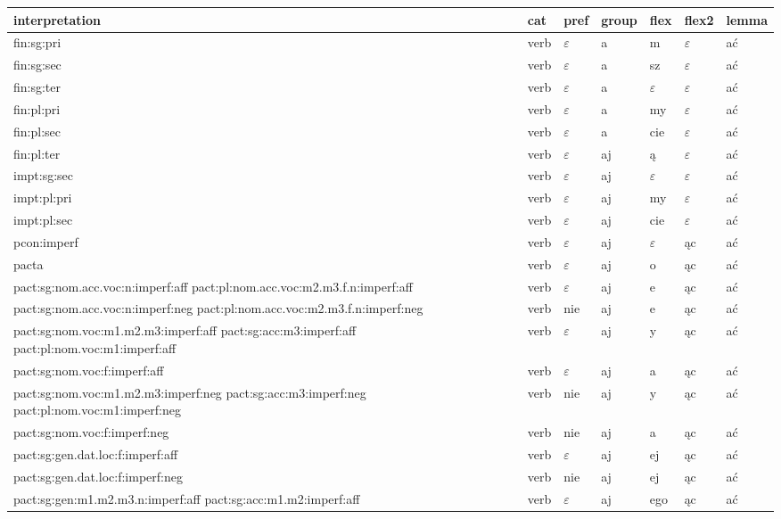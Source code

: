 \documentclass{article}
\begin{document}
\begin{longtable}{p{7cm}|l|l|l|l|l|l}
interpretation & cat & pref & group & flex & flex2 & lemma\\
\hline
fin:sg:pri & verb & $\varepsilon$ & a & m & $\varepsilon$ & ać\\
fin:sg:sec & verb & $\varepsilon$ & a & sz & $\varepsilon$ & ać\\
fin:sg:ter & verb & $\varepsilon$ & a & $\varepsilon$ & $\varepsilon$ & ać\\
fin:pl:pri & verb & $\varepsilon$ & a & my & $\varepsilon$ & ać\\
fin:pl:sec & verb & $\varepsilon$ & a & cie & $\varepsilon$ & ać\\
fin:pl:ter & verb & $\varepsilon$ & aj & ą & $\varepsilon$ & ać\\
impt:sg:sec & verb & $\varepsilon$ & aj & $\varepsilon$ & $\varepsilon$ & ać\\
impt:pl:pri & verb & $\varepsilon$ & aj & my & $\varepsilon$ & ać\\
impt:pl:sec & verb & $\varepsilon$ & aj & cie & $\varepsilon$ & ać\\
pcon:imperf & verb & $\varepsilon$ & aj & $\varepsilon$ & ąc & ać\\
pacta & verb & $\varepsilon$ & aj & o & ąc & ać\\
pact:sg:nom.acc.voc:n:imperf:aff pact:pl:nom.acc.voc:m2.m3.f.n:imperf:aff & verb & $\varepsilon$ & aj & e & ąc & ać\\
pact:sg:nom.acc.voc:n:imperf:neg pact:pl:nom.acc.voc:m2.m3.f.n:imperf:neg & verb & nie & aj & e & ąc & ać\\
pact:sg:nom.voc:m1.m2.m3:imperf:aff pact:sg:acc:m3:imperf:aff pact:pl:nom.voc:m1:imperf:aff & verb & $\varepsilon$ & aj & y & ąc & ać\\
pact:sg:nom.voc:f:imperf:aff & verb & $\varepsilon$ & aj & a & ąc & ać\\
pact:sg:nom.voc:m1.m2.m3:imperf:neg pact:sg:acc:m3:imperf:neg pact:pl:nom.voc:m1:imperf:neg & verb & nie & aj & y & ąc & ać\\
pact:sg:nom.voc:f:imperf:neg & verb & nie & aj & a & ąc & ać\\
pact:sg:gen.dat.loc:f:imperf:aff & verb & $\varepsilon$ & aj & ej & ąc & ać\\
pact:sg:gen.dat.loc:f:imperf:neg & verb & nie & aj & ej & ąc & ać\\
pact:sg:gen:m1.m2.m3.n:imperf:aff pact:sg:acc:m1.m2:imperf:aff & verb & $\varepsilon$ & aj & ego & ąc & ać\\

\end{longtable}
\end{document}
